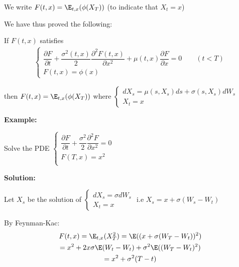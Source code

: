 \noindent We write $F(t,x) = \E_{t,x}(\phi(X_T))$ (to indicate that $X_t = x$)
\par\bigskip
\noindent We have thus proved the following:
\par\bigskip
\begin{theo}{}
  If $F(t,x)$ satisfies
  \begin{equation*}
    \begin{gathered}
      \begin{cases}
        \dfrac{\partial F}{\partial t}+\dfrac{\sigma^2(t,x)}{2}\dfrac{\partial^2 F(t,x)}{\partial x^2}+\mu(t,x)\dfrac{\partial F}{\partial x} = 0\qquad (t<T)\\
        F(t,x) = \phi(x)
      \end{cases}
    \end{gathered}
  \end{equation*}\par
  \noindent then $F(t,x) = \E_{t,x}(\phi(X_T))$ where $\begin{cases}
    dX_s = \mu(s,X_s)ds+\sigma(s,X_s)dW_s\\X_t = x
  \end{cases}$
\end{theo}
\par\bigskip
\noindent\textbf{Example:}\par
\noindent Solve the PDE $\begin{cases}
  \dfrac{\partial F}{\partial t}+\dfrac{\sigma^2}{2}\dfrac{\partial^2 F}{\partial x^2} = 0\\
  F(T,x) = x^2\\
\end{cases}$
\par\bigskip
\noindent\textbf{Solution:}\par
\noindent Let $X_s$ be the solution of $\begin{cases}
  dX_s = \sigma dW_s\\X_t = x
\end{cases}$ i.e $X_s = x+\sigma(W_s-W_t)$\par
\noindent By Feynman-Kac:
\begin{equation*}
  \begin{gathered}
    F(t,x) = \E_{t,x}(X_T^2) = \E((x+\sigma(W_T-W_t))^2)\\
    = x^2+2x\sigma\E(W_t-W_t)+\sigma^2\E((W_T-W_t)^2)\\
    = x^2+\sigma^2(T-t)
  \end{gathered}
\end{equation*}\par
